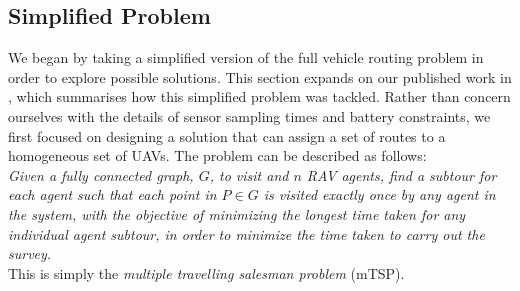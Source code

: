 \subsection{Simplified Problem}
We began by taking a simplified version of the full vehicle routing problem in order to explore possible solutions. This section expands on our published work in \cite{Smyth2018UsingDrones}, which summarises how this simplified problem was tackled. Rather than concern ourselves with the details of sensor sampling times and battery constraints, we first focused on designing a solution that can assign a set of routes to a homogeneous set of UAVs. 
The problem can be described as follows:
\\
\textit{Given a fully connected graph, $G$, to visit and $n$ RAV agents, find a subtour for each agent such that each point in $P \in G$ is visited exactly once by any agent in the system, with the objective of minimizing the longest time taken for any individual agent subtour, in order to minimize the time taken to carry out the survey.}
\\
This is simply the \textit{ multiple travelling salesman problem} (mTSP). 


